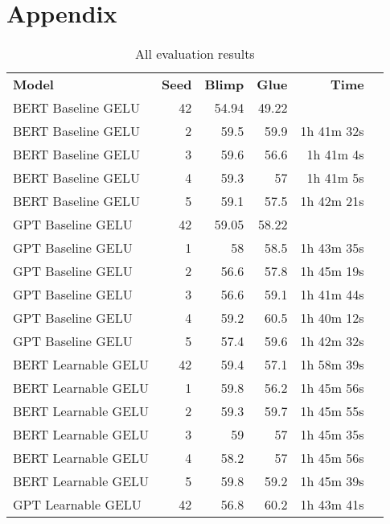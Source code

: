 \section{Appendix}
\label{Appendix}
\begin{table}[!htp]\centering
    \caption{All evaluation results}\label{table:all-results}
    \scriptsize
    \begin{tabular}{lrrrrr}\toprule
    \textbf{Model} &\textbf{Seed} &\textbf{Blimp} &\textbf{Glue} &\textbf{Time} \\\cmidrule{1-5}
    BERT Baseline GELU &42 &54.94 &49.22 & \\
    BERT Baseline GELU &2 &59.5 &59.9 &1h 41m 32s \\
    BERT Baseline GELU &3 &59.6 &56.6 &1h 41m 4s \\
    BERT Baseline GELU &4 &59.3 &57 &1h 41m 5s \\
    BERT Baseline GELU &5 &59.1 &57.5 &1h 42m 21s \\
    GPT Baseline GELU &42 &59.05 &58.22 & \\
    GPT Baseline GELU &1 &58 &58.5 &1h 43m 35s \\
    GPT Baseline GELU &2 &56.6 &57.8 &1h 45m 19s \\
    GPT Baseline GELU &3 &56.6 &59.1 &1h 41m 44s \\
    GPT Baseline GELU &4 &59.2 &60.5 &1h 40m 12s \\
    GPT Baseline GELU &5 &57.4 &59.6 &1h 42m 32s \\
    BERT Learnable GELU &42 &59.4 &57.1 &1h 58m 39s \\
    BERT Learnable GELU &1 &59.8 &56.2 &1h 45m 56s \\
    BERT Learnable GELU &2 &59.3 &59.7 &1h 45m 55s \\
    BERT Learnable GELU &3 &59 &57 &1h 45m 35s \\
    BERT Learnable GELU &4 &58.2 &57 &1h 45m 56s \\
    BERT Learnable GELU &5 &59.8 &59.2 &1h 45m 39s \\
    GPT Learnable GELU &42 &56.8 &60.2 &1h 43m 41s \\

\end{tabular}
\end{table}
